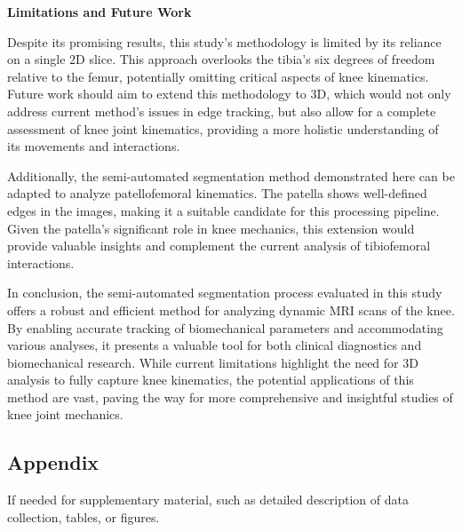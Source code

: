 \documentclass{micro-econ-thesis}
\begin{document}
\textbf{Limitations and Future Work}

Despite its promising results, this study's methodology is limited by its reliance on a single 2D slice. This approach overlooks the tibia's six degrees of freedom relative to the femur, potentially omitting critical aspects of knee kinematics. Future work should aim to extend this methodology to 3D, which would not only address current method's issues in edge tracking, but also allow for a complete assessment of knee joint kinematics, providing a more holistic understanding of its movements and interactions.

Additionally, the semi-automated segmentation method demonstrated here can be adapted to analyze patellofemoral kinematics. The patella shows well-defined edges in the images, making it a suitable candidate for this processing pipeline. Given the patella's significant role in knee mechanics, this extension would provide valuable insights and complement the current analysis of tibiofemoral interactions.

In conclusion, the semi-automated segmentation process evaluated in this study offers a robust and efficient method for analyzing dynamic MRI scans of the knee. By enabling accurate tracking of biomechanical parameters and accommodating various analyses, it presents a valuable tool for both clinical diagnostics and biomechanical research. While current limitations highlight the need for 3D analysis to fully capture knee kinematics, the potential applications of this method are vast, paving the way for more comprehensive and insightful studies of knee joint mechanics.
\cleardoublepage
{}
{} %
\printbibliography

\cleardoublepage
\begin{appendix}
\section{Appendix}
If needed for supplementary material, such as detailed description of data collection, tables, or figures.

\end{appendix}

\makeThesisDeclaration
\end{document}
